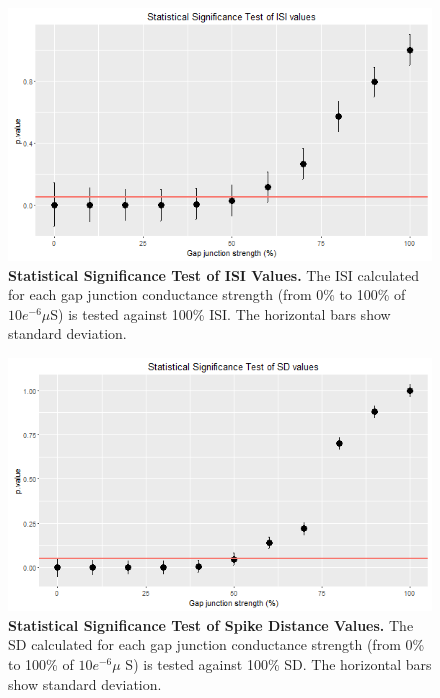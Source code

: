 \begin{figure}[H]
	\begin{center}
		\includegraphics[width=14cm]{graphics/NewISIpvalue.png}
		\caption[Statistical Significance Test of ISI Values.]{\textbf{Statistical Significance Test of ISI Values.} The \ac{ISI} calculated for each gap junction conductance strength (from 0\% to 100\% of $10e^{-6}\mu$S) is tested against 100\% \ac{ISI}. The horizontal bars show standard deviation.}
		\label{fig:ttest_ISI}
	\end{center}
\end{figure}
\begin{figure}[H]
	\begin{center}
		\includegraphics[width=14cm]{graphics/NewSDpvalue.png}
		\caption[Statistical Significance Test of Spike Distance Values.]{\textbf{Statistical Significance Test of Spike Distance Values.} The \ac{SD} calculated for each gap junction conductance strength (from 0\% to 100\% of $10e^{-6}\mu$ S) is tested against 100\% \ac{SD}. The horizontal bars show standard deviation.}
		\label{fig:ttest_SD}
	\end{center}
\end{figure}

